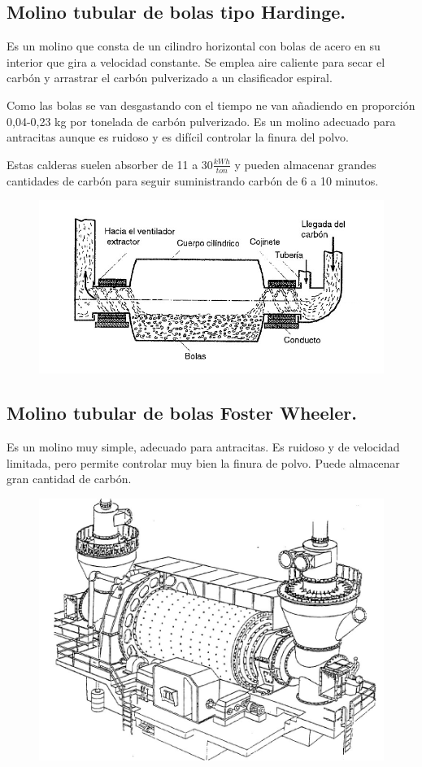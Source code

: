 \subsection{Molino tubular de bolas tipo Hardinge.}
Es un molino que consta de un cilindro horizontal con bolas de acero en su interior que gira a velocidad constante. Se emplea aire caliente para secar el carbón y arrastrar el carbón pulverizado a un clasificador espiral.



Como las bolas se van desgastando con el tiempo ne van añadiendo en proporción 0,04-0,23 kg por tonelada de carbón pulverizado. Es un molino adecuado para antracitas aunque es ruidoso y es difícil controlar la finura del polvo. 



Estas calderas suelen absorber de 11 a 30$\frac{kWh}{ton}$ y pueden almacenar grandes cantidades de carbón para seguir suministrando carbón de 6 a 10 minutos.
\begin{figure}[H]
	\centering
	\includegraphics[width=0.6\linewidth]{res/tema10/molinoHardinge}
	\label{fig:molinohardinge}
\end{figure}

\subsection{Molino tubular de bolas Foster Wheeler.}
Es un molino muy simple, adecuado para antracitas. Es ruidoso y de velocidad limitada, pero permite controlar muy bien la finura de polvo. Puede almacenar gran cantidad de carbón.
\begin{figure}[H]
	\centering
	\includegraphics[width=0.4\linewidth]{res/tema10/fosterWheeler}
	\label{fig:fosterwheeler}
\end{figure}


